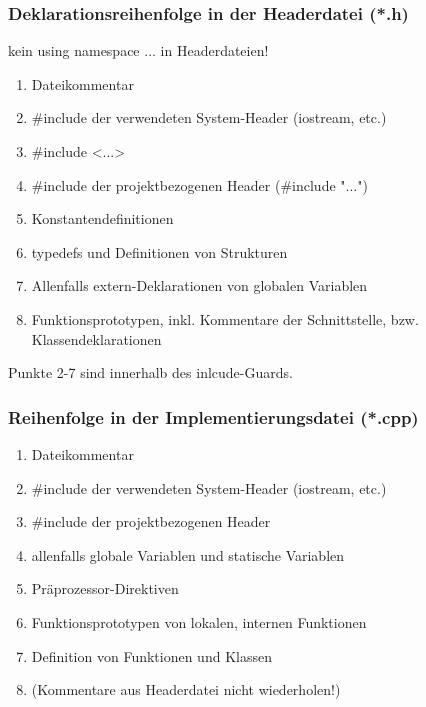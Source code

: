\subsubsection{Deklarationsreihenfolge in der Headerdatei (*.h)\hfill}
\label{sec:Deklarationsreihenfolge in der Headerdatei}
\begin{achtung}
	kein using namespace ... in Headerdateien!
\end{achtung}
\begin{enumerate}
	\item Dateikommentar
	\item \#include der verwendeten System-Header (iostream, etc.)
	\item[\-] \#include <...>
	\item \#include der projektbezogenen Header (\#include "...")
	\item Konstantendefinitionen
	\item typedefs und Definitionen von Strukturen
	\item Allenfalls extern-Deklarationen von globalen Variablen
	\item Funktionsprototypen, inkl. Kommentare der Schnittstelle, bzw. Klassendeklarationen
\end{enumerate}
\begin{hinweis}
	Punkte 2-7 sind innerhalb des inlcude-Guards.
\end{hinweis}

\subsubsection{Reihenfolge in der Implementierungsdatei (*.cpp)\hfill}
\label{sec:Reihenfolge in der Implementierungsdatei}
\begin{enumerate}
	\item Dateikommentar
	\item \#include der verwendeten System-Header (iostream, etc.)
	\item \#include der projektbezogenen Header
	\item allenfalls globale Variablen und statische Variablen
	\item Präprozessor-Direktiven
	\item Funktionsprototypen von lokalen, internen Funktionen
	\item Definition von Funktionen und Klassen
	\item[\-] \color{\ownRed} (Kommentare aus Headerdatei nicht wiederholen!)
\end{enumerate}

